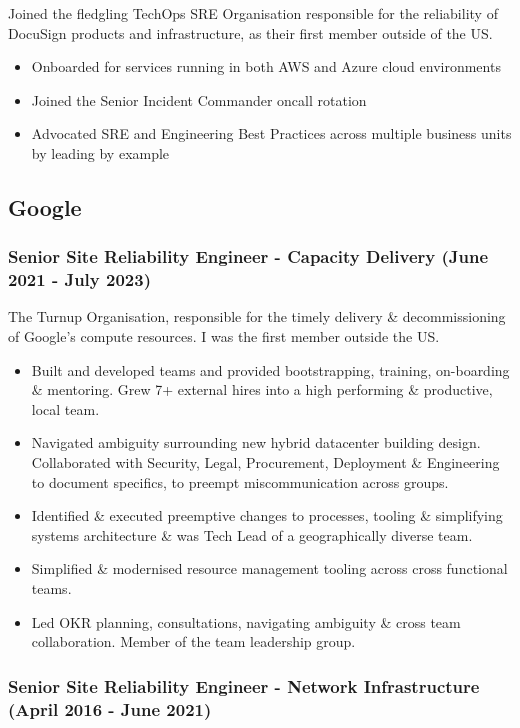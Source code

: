 \documentclass[a4paper, 10pt] {article}
\begin{document}
Joined the fledgling TechOps SRE Organisation responsible for the reliability of DocuSign products and infrastructure,
as their first member outside of the US.

\begin{itemize}[noitemsep]
	\item Onboarded for services running in both AWS and Azure cloud environments
 	\item Joined the Senior Incident Commander oncall rotation
 	\item Advocated SRE and Engineering Best Practices across multiple business units by leading by example
\end{itemize}

\subsection*{Google}

\subsubsection*{Senior Site Reliability Engineer - Capacity Delivery (June 2021 - July 2023)}

The Turnup Organisation, responsible for the timely delivery \&
decommissioning of Google's compute resources. I was the first member
outside the US.

\begin{itemize}[noitemsep]
	\item Built and developed teams and provided bootstrapping, training, 
		on-boarding \& mentoring. Grew 7+ external hires into a high performing \&
		productive, local team.
  	\item Navigated ambiguity surrounding new hybrid datacenter building design.
		Collaborated with Security, Legal, Procurement, Deployment \& 
		Engineering to document specifics, to preempt miscommunication across groups.
	\item Identified \& executed preemptive changes to processes, tooling \& simplifying systems
		architecture \& was Tech Lead of a geographically diverse team.
	\item Simplified \& modernised resource management tooling across cross functional teams.
	\item Led OKR planning, consultations, navigating ambiguity \& cross team collaboration. Member
		of the team leadership group.
\end{itemize}

\subsubsection*{Senior Site Reliability Engineer - Network Infrastructure (April 2016 - June 2021)}
\end{document}
